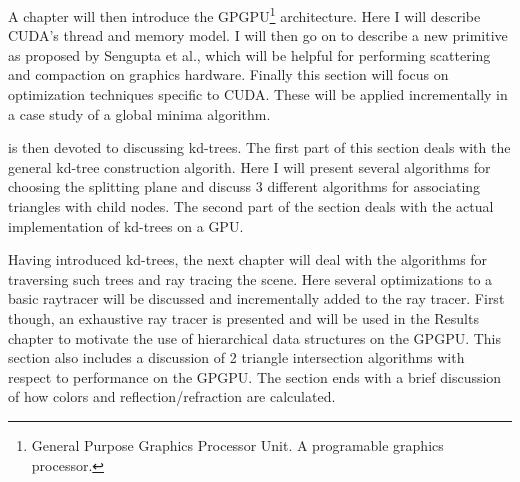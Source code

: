 
A chapter will then introduce the GPGPU\footnote{General Purpose
  Graphics Processor Unit. A programable graphics processor.}
architecture. Here I will describe CUDA's thread and memory model. I
will then go on to describe a new primitive as proposed by Sengupta et
al., which will be helpful for performing
scattering and compaction on graphics hardware. Finally this
section will focus on optimization techniques specific to CUDA. These
will be applied incrementally in a case study of a global minima
algorithm.


 is then devoted to discussing kd-trees. The
first part of this section deals with the general kd-tree construction
algorith. Here I will present several algorithms for choosing the
splitting plane and discuss 3 different algorithms for associating
triangles with child nodes. The second part of the section deals with
the actual implementation of kd-trees on a GPU.


Having introduced kd-trees, the next chapter will deal with the
algorithms for traversing such trees and ray tracing the scene. Here
several optimizations to a basic raytracer will be discussed and
incrementally added to the ray tracer. First though, an exhaustive ray
tracer is presented and will be used in the Results chapter to
motivate the use of hierarchical data structures on the GPGPU. This
section also includes a discussion of 2 triangle intersection
algorithms with respect to performance on the GPGPU. The section ends
with a brief discussion of how colors and reflection/refraction
are calculated.



